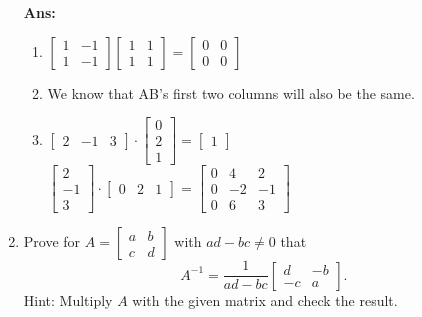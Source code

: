 \documentclass[12pt,a4paper]{amsart}
\newcommand\sol[1]{
\medskip
\begin{mdframed}
\textbf{Ans:\\} #1
\end{mdframed}
\medskip
}
\begin{document}
\begin{enumerate}
\sol{
  \begin{enumerate}
    \item
      $\left[\begin{matrix} 1 & -1 \\ 1 & -1\end{matrix}\right]\left[\begin{matrix} 1 & 1 \\ 1 & 1\end{matrix}\right]=\left[\begin{matrix} 0 & 0 \\ 0 & 0\end{matrix}\right]$
    \item
      We know that AB's first two columns will also be the same.
    \item
      $\left[\begin{matrix} 2 & -1 & 3\end{matrix}\right]\cdot\left[\begin{matrix} 0 \\ 2 \\ 1\end{matrix}\right]=\left[\begin{matrix} 1 \end{matrix}\right]$ \\ %
      $\left[\begin{matrix} 2 \\ -1 \\ 3\end{matrix}\right]\cdot\left[\begin{matrix} 0 & 2 & 1\end{matrix}\right]=\left[\begin{matrix} 0 & 4 & 2 \\ 0 & -2 & -1 \\ 0 & 6 & 3 \end{matrix}\right]$ 
  \end{enumerate}
}
 
\item
 Prove for $A = \left[\begin{matrix} a & b \\ c & d \end{matrix}\right]$
 with $ad-bc\neq 0$ that
\vspace{-1mm} 
\[ A^{-1} = \frac{1}{ad-bc} \left[\begin{matrix} d & -b \\ -c & a \end{matrix}\right]. \] 
 Hint: Multiply $A$ with the given matrix and check the result.





\end{enumerate}
\end{document}
